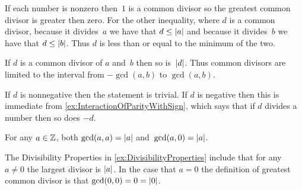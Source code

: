 \documentclass{test}  %
\begin{document}
\begin{problem}
\begin{exes}
\begin{answer}
  If each number is nonzero then~$1$ is a common divisor so 
  the greatest common divisor is greater then zero.
  For the other inequality,
  where $d$ is a common divisor, 
  because it divides~$a$ we have that $d\leq\lvert a\rvert$ and
  because it divides~$b$ we have that $d\leq\lvert b\rvert$.
  Thus $d$ is less than or equal to the minimum of the two.   
\end{answer}
\begin{exercise} 
  If $d$ is a common divisor of $a$ and~$b$ then so is~$\lvert d\rvert$.
  Thus common divisors are limited to the interval from $-\gcd(a,b)$
  to $\gcd(a,b)$.
\end{exercise}
\begin{answer}
  If $d$ is nonnegative then the statement is trivial.
  If $d$ is negative then
  this is immediate from \ref{ex:InteractionOfParityWithSign},
  which says that if $d$ divides a number then so does $-d$.  
\end{answer}
\begin{exercise} 
  For any $a\in\mathbb{Z}$, both $\gcd(a,a)=\lvert a\rvert$ 
  and~$\gcd(a,0)=\lvert a\rvert$.
\end{exercise}
\begin{answer}
  The Divisibility Properties in \ref{ex:DivisibilityProperties}
  include that for any~$a\neq 0$ the largest divisor is $\lvert a\rvert$.
  In the case that $a=0$ the definition of greatest common divisor 
  is that $\gcd(0,0)=0=\lvert0\rvert$.


\end{answer}
\end{exes}
\end{problem}
\end{document}
